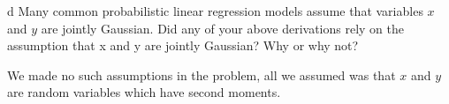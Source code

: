 \documentclass[expanded]{lkx_pset}
\begin{document}
\begin{parts}
	\begin{part}{d}
		Many common probabilistic linear regression models assume that
		variables $x$ and $y$ are jointly Gaussian.  Did any of your above
		derivations rely on the assumption that x and y are jointly
		Gaussian?  Why or why not?
	\end{part}

	We made no such assumptions in the problem, all we assumed was that $x$ and $y$ are random variables which have second moments.
\end{parts}
\end{document}

